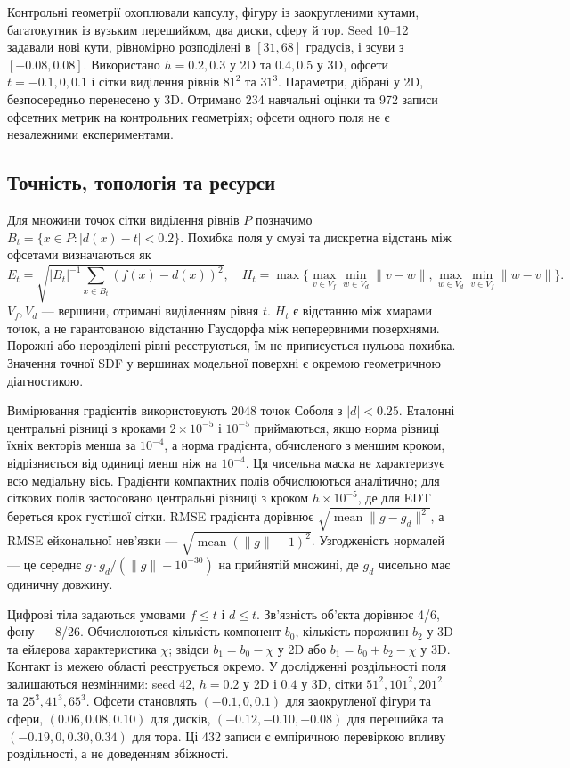 \documentclass[12pt]{article}
\begin{document}
Контрольні геометрії охоплювали капсулу, фігуру із заокругленими кутами, багатокутник із вузьким перешийком, два диски, сферу й тор. Seed 10--12 задавали нові кути, рівномірно розподілені в $[31,68]$ градусів, і зсуви з $[-0.08,0.08]$. Використано $h=0.2,0.3$ у 2D та $0.4,0.5$ у 3D, офсети $t=-0.1,0,0.1$ і сітки виділення рівнів $81^2$ та $31^3$. Параметри, дібрані у 2D, безпосередньо перенесено у 3D. Отримано 234 навчальні оцінки та 972 записи офсетних метрик на контрольних геометріях; офсети одного поля не є незалежними експериментами.

\subsection{Точність, топологія та ресурси}
Для множини точок сітки виділення рівнів $P$ позначимо $B_t=\{x\in P:|d(x)-t|<0.2\}$. Похибка поля у смузі та дискретна відстань між офсетами визначаються як
\begin{equation}
    E_t=\sqrt{|B_t|^{-1}\sum_{x\in B_t}(f(x)-d(x))^2},\quad
    H_t=\max\{\max_{v\in V_f}\min_{w\in V_d}\|v-w\|,\max_{w\in V_d}\min_{v\in V_f}\|w-v\|\}.
\end{equation}
$V_f,V_d$ — вершини, отримані виділенням рівня $t$. $H_t$ є відстанню між хмарами точок, а не гарантованою відстанню Гаусдорфа між неперервними поверхнями. Порожні або нерозділені рівні реєструються, їм не приписується нульова похибка. Значення точної SDF у вершинах модельної поверхні є окремою геометричною діагностикою.

Вимірювання градієнтів використовують 2048 точок Соболя з $|d|<0.25$. Еталонні центральні різниці з кроками $2\times10^{-5}$ і $10^{-5}$ приймаються, якщо норма різниці їхніх векторів менша за $10^{-4}$, а норма градієнта, обчисленого з меншим кроком, відрізняється від одиниці менш ніж на $10^{-4}$. Ця чисельна маска не характеризує всю медіальну вісь. Градієнти компактних полів обчислюються аналітично; для сіткових полів застосовано центральні різниці з кроком $h\times10^{-5}$, де для EDT береться крок густішої сітки. RMSE градієнта дорівнює $\sqrt{\operatorname{mean}\|g-g_d\|^2}$, а RMSE ейкональної нев'язки — $\sqrt{\operatorname{mean}(\|g\|-1)^2}$. Узгодженість нормалей — це середнє $g\cdot g_d/(\|g\|+10^{-30})$ на прийнятій множині, де $g_d$ чисельно має одиничну довжину.

Цифрові тіла задаються умовами $f\le t$ і $d\le t$. Зв'язність об'єкта дорівнює 4/6, фону — 8/26. Обчислюються кількість компонент $b_0$, кількість порожнин $b_2$ у 3D та ейлерова характеристика $\chi$; звідси $b_1=b_0-\chi$ у 2D або $b_1=b_0+b_2-\chi$ у 3D. Контакт із межею області реєструється окремо. У дослідженні роздільності поля залишаються незмінними: seed 42, $h=0.2$ у 2D і $0.4$ у 3D, сітки $51^2,101^2,201^2$ та $25^3,41^3,65^3$. Офсети становлять $(-0.1,0,0.1)$ для заокругленої фігури та сфери, $(0.06,0.08,0.10)$ для дисків, $(-0.12,-0.10,-0.08)$ для перешийка та $(-0.19,0,0.30,0.34)$ для тора. Ці 432 записи є емпіричною перевіркою впливу роздільності, а не доведенням збіжності.
\end{document}
